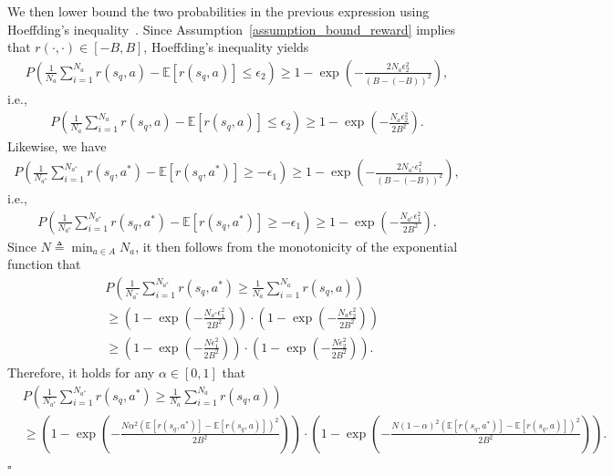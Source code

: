 \documentclass[10pt]{article}
\newenvironment{myproof}{{\noindent\it Proof. }}{\hfill $\square$ \par}
\def\mbE{{\ensuremath{\mathbb E}}}
\begin{document}
\begin{myproof}
We then lower bound the two probabilities in the previous expression using Hoeffding’s inequality~\citep{hoeffding1994probability}.
Since Assumption~\ref{assumption_bound_reward} implies that $r(\cdot, \cdot) \in [-B, B]$, Hoeffding’s inequality yields
\begin{align}
    P \left( \frac{1}{N_{a}} \sum_{i=1}^{N_{a}}  r(s_q, a) - \mbE[ r(s_q, a)] \leq \epsilon_2 \right) \geq 1 - \exp \left( - \frac{2 N_{a} \epsilon_2^2}{(B- (-B))^2} \right),
\end{align}
i.e.,
\begin{align}
    P \left( \frac{1}{N_{a}} \sum_{i=1}^{N_{a}}  r(s_q, a) - \mbE[ r(s_q, a)] \leq \epsilon_2 \right) \geq 1 - \exp \left( - \frac{N_{a} \epsilon_2^2}{2B^2} \right).
\end{align}
Likewise, we have
\begin{align}
    P \left( \frac{1}{N_{a^*}}  \sum_{i=1}^{N_{a^*}} r(s_q, a^*) - \mbE[ r(s_q, a^*)] \geq -\epsilon_1 \right) \geq 1 - \exp \left( - \frac{2N_{a^*} \epsilon_1^2}{(B- (-B))^2} \right),
\end{align}
i.e.,
\begin{align}
    P \left( \frac{1}{N_{a^*}}  \sum_{i=1}^{N_{a^*}} r(s_q, a^*) - \mbE[ r(s_q, a^*)] \geq -\epsilon_1 \right) \geq 1 - \exp \left( - \frac{N_{a^*} \epsilon_1^2}{2B^2} \right).
\end{align}
Since $N\triangleq \min_{a \in A}  N_a$, it then follows from the monotonicity of the exponential function that
\begin{align}
    &P \left( \frac{1}{N_{a^*}}  \sum_{i=1}^{N_{a^*}} r(s_q, a^*) \geq \frac{1}{N_{a}} \sum_{i=1}^{N_{a}}  r(s_q, a) \right) \nonumber \\
    &\geq \left( 1 - \exp \left( - \frac{N_{a^*} \epsilon_1^2}{2B^2} \right) \right) \cdot \left( 1 - \exp \left( - \frac{N_{a} \epsilon_2^2}{2B^2} \right) \right) \\
    &\geq \left( 1 - \exp \left( - \frac{N \epsilon_1^2}{2B^2} \right) \right) \cdot \left( 1 - \exp \left( - \frac{N \epsilon_2^2}{2B^2} \right) \right).
\end{align}
Therefore, it holds for any $\alpha \in [0, 1]$ that
\begin{align}
    &P \left( \frac{1}{N_{a^*}}  \sum_{i=1}^{N_{a^*}} r(s_q, a^*) \geq \frac{1}{N_{a}} \sum_{i=1}^{N_{a}}  r(s_q, a) \right) \nonumber \\
    &\geq \left( 1 - \exp \left( - \frac{N \alpha^2 \left(\mbE[r(s_q, a^*)] - \mbE[r(s_q, a)] \right)^2}{2B^2} \right) \right) \!\! \cdot \!\! \left( 1 - \exp \left( - \frac{N (1-\alpha)^2 \left(\mbE[r(s_q, a^*)] - \mbE[r(s_q, a)] \right)^2}{2B^2} \right) \right).

\end{align}
\end{myproof}
\end{document}
